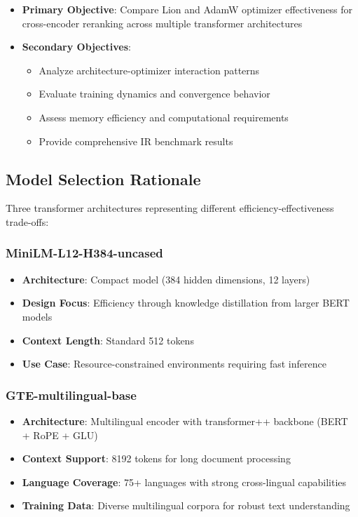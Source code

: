 \begin{itemize}
    \item \textbf{Primary Objective}: Compare Lion and AdamW optimizer effectiveness for cross-encoder reranking across multiple transformer architectures
    \item \textbf{Secondary Objectives}: 
    \begin{itemize}
        \item Analyze architecture-optimizer interaction patterns
        \item Evaluate training dynamics and convergence behavior
        \item Assess memory efficiency and computational requirements
        \item Provide comprehensive IR benchmark results
    \end{itemize}
\end{itemize}

\subsection{Model Selection Rationale}

Three transformer architectures representing different efficiency-effectiveness trade-offs:

\subsubsection{MiniLM-L12-H384-uncased}
\begin{itemize}
    \item \textbf{Architecture}: Compact model (384 hidden dimensions, 12 layers)
    \item \textbf{Design Focus}: Efficiency through knowledge distillation from larger BERT models
    \item \textbf{Context Length}: Standard 512 tokens
    \item \textbf{Use Case}: Resource-constrained environments requiring fast inference
\end{itemize}

\subsubsection{GTE-multilingual-base}
\begin{itemize}
    \item \textbf{Architecture}: Multilingual encoder with transformer++ backbone (BERT + RoPE + GLU)
    \item \textbf{Context Support}: 8192 tokens for long document processing
    \item \textbf{Language Coverage}: 75+ languages with strong cross-lingual capabilities
    \item \textbf{Training Data}: Diverse multilingual corpora for robust text understanding
\end{itemize}

